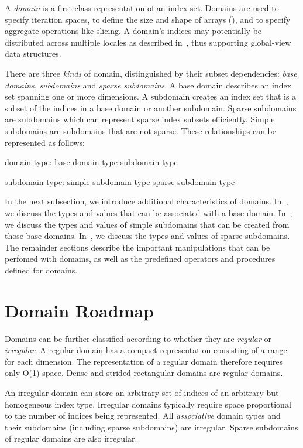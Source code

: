 \label{Domains}

A \emph{domain} is a first-class representation of an index set.
Domains are used to specify iteration spaces, to define the size and
shape of arrays (), and to specify aggregate operations
like slicing.  A domain's
indices may potentially be distributed across multiple locales as
described in~, thus supporting global-view data
structures.

There are three \emph{kinds} of domain, distinguished by their subset
dependencies: \emph{base domains}, \emph{subdomains} and \emph{sparse
subdomains}.  A base domain describes an index set spanning one or more
dimensions.  A subdomain creates an index set that is a subset of the indices in
a base domain or another subdomain.  Sparse subdomains are subdomains which can
represent sparse index subsets efficiently.  Simple subdomains are subdomains
that are not sparse.  These relationships can be represented as follows:


\begin{syntax}
domain-type:
  base-domain-type
  subdomain-type

subdomain-type:
  simple-subdomain-type
  sparse-subdomain-type
\end{syntax}

In the next subsection, we introduce additional characteristics of domains.
In~, we discuss the types and values that
can be associated with a base domain.  In~, we discuss the
types and values of simple subdomains that can be created from those base
domains.  In~, we discuss the types and values of sparse
subdomains.  The remainder sections describe the important manipulations
that can be perfomed with domains, as well as the predefined operators and
procedures defined for domains.

\section{Domain Roadmap}

Domains can be further classified according to whether they are \emph{regular}
or \emph{irregular}.  A regular domain has a compact representation consisting
of a range for each dimension.  The representation of a regular domain therefore
requires only O(1) space.  Dense and strided rectangular domains are
regular domains.

An irregular domain can store an arbitrary set of indices of an arbitrary but
homogeneous index type.  Irregular domains typically require space proportional
to the number of indices being represented.  All \emph{associative} domain types
and their subdomains (including sparse subdomains) are irregular.  Sparse
subdomains of regular domains are also irregular.


